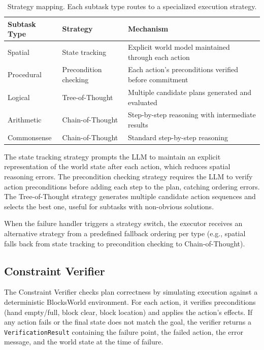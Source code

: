 \documentclass{article}
\begin{document}
\begin{table}[h]
\centering
\small
\begin{tabular}{lll}
\toprule
\textbf{Subtask Type} & \textbf{Strategy} & \textbf{Mechanism} \\
\midrule
Spatial & State tracking & Explicit world model maintained through each action \\
Procedural & Precondition checking & Each action's preconditions verified before commitment \\
Logical & Tree-of-Thought & Multiple candidate plans generated and evaluated \\
Arithmetic & Chain-of-Thought & Step-by-step reasoning with intermediate results \\
Commonsense & Chain-of-Thought & Standard step-by-step reasoning \\
\bottomrule
\end{tabular}
\caption{Strategy mapping. Each subtask type routes to a specialized execution strategy.}
\label{tab:strategies}
\end{table}

The state tracking strategy prompts the LLM to maintain an explicit representation of the world state after each action, which reduces spatial reasoning errors. The precondition checking strategy requires the LLM to verify action preconditions before adding each step to the plan, catching ordering errors. The Tree-of-Thought strategy generates multiple candidate action sequences and selects the best one, useful for subtasks with non-obvious solutions.

When the failure handler triggers a strategy switch, the executor receives an alternative strategy from a predefined fallback ordering per type (e.g., spatial falls back from state tracking to precondition checking to Chain-of-Thought).

\subsection{Constraint Verifier}

The Constraint Verifier checks plan correctness by simulating execution against a deterministic BlocksWorld environment. For each action, it verifies preconditions (hand empty/full, block clear, block location) and applies the action's effects. If any action fails or the final state does not match the goal, the verifier returns a \texttt{VerificationResult} containing the failure point, the failed action, the error message, and the world state at the time of failure.
\end{document}
